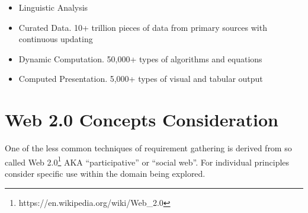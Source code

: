 \begin{itemize}
\item
  {Linguistic Analysis}
\item
  {Curated Data. 10+ trillion pieces of data from primary sources with continuous updating}
\item
  {Dynamic Computation. 50,000+ types of algorithms and equations}
\item
  {Computed Presentation. 5,000+ types of visual and tabular output}
\end{itemize}

\section{Web 2.0 Concepts Consideration} \label{sec:web20}

{One of the less common techniques of requirement gathering is derived from so called Web 2.0\footnote{https://en.wikipedia.org/wiki/Web\_2.0} AKA ``participative'' or ``social web''. For individual principles consider specific use within the domain being explored.}

